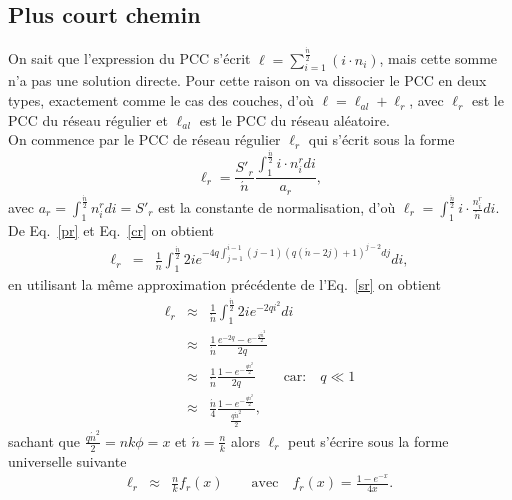 \subsection{Plus court chemin}
On sait que l'expression du PCC s'écrit  $\ell=\sum_{i=1}^{\frac{\acute{n}}{2}}(i\cdot n_i)$, mais cette somme n'a pas une solution 
directe. Pour cette raison on va dissocier le PCC en deux types, exactement comme le cas des couches, d'où $\ell=\ell_{al}+\ell_r$, avec $\ell_r$ est le PCC du réseau régulier  et $\ell_{al}$ est le PCC du réseau aléatoire.\\
On commence par le PCC de réseau régulier $\ell_r$ qui s'écrit sous la forme 
\begin{equation}
\ell_r=\frac{S'_r}{\acute{n}}\frac{\int_1^{\frac{\acute{n}}{2}}i\cdot n_{i}^{r}di}{a_r},
\end{equation}
avec $a_r=\int_1^{\frac{\acute{n}}{2}}n_{i}^{r}di=S'_r$
est la constante de normalisation, d'où $\ell_r=\int_1^{\frac{\acute{n}}{2}}i\cdot\frac{n_{i}^{r}}{\acute{n}}di$.\\
De Eq.~\ref{pr} et Eq.~\ref{cr} on obtient
\begin{eqnarray}
\ell_r&=&\frac{1}{\acute{n}}\int^{\frac{\acute{n}}{2}}_1 2ie^{-4q\int_{j=1}^{i-1}(j-1)(q(\acute{n}-2j)+1)^{j-2}dj}di,\nonumber
\end{eqnarray}
en utilisant la m\^{e}me approximation précédente de l'Eq.~\ref{sr} on obtient
\begin{eqnarray}
\ell_r &\approx&\frac{1}{\acute{n}}\int_1^{\frac{\acute{n}}{2}}2ie^{-2qi^2}di \\\nonumber
&\approx&\frac{1}{\acute{n}}\frac{e^{-2q}-e^{-\frac{q\acute{n}^2}{2}}}{2q}\\\nonumber
&\approx&\frac{1}{\acute{n}}\frac{1-e^{-\frac{q\acute{n}^2}{2}}}{2q} \quad \quad  \text{car:} \quad q\ll1 \\\nonumber
&\approx&\frac{\acute{n}}{4}\frac{1-e^{-\frac{q\acute{n}^2}{2}}}{\frac{q\acute{n}^2}{2}},\nonumber
\end{eqnarray}
sachant que $\frac{q\acute{n}^2}{2}=nk\phi=x$ et $\acute{n}=\frac{n}{k}$ alors $\ell_r$ peut s'écrire sous la forme universelle suivante
\begin{eqnarray}
\ell_r&\approx&\frac{n}{k}f_r(x) \quad \quad \textrm{avec} \quad f_r(x)=\frac{1-e^{-x}}{4x}.
\label{lr}
\end{eqnarray}

